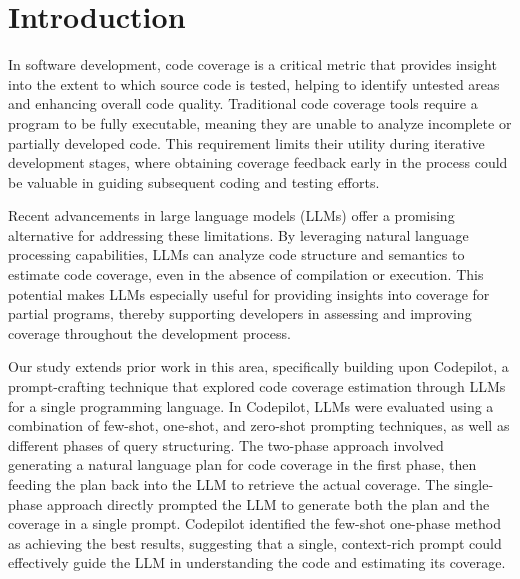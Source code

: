 \documentclass[sigconf]{acmart}
\begin{document}
\maketitle

\section{Introduction}
In software development, code coverage is a critical metric that provides insight into the extent to which source code is tested, helping to identify untested areas and enhancing overall code quality. Traditional code coverage tools require a program to be fully executable, meaning they are unable to analyze incomplete or partially developed code. This requirement limits their utility during iterative development stages, where obtaining coverage feedback early in the process could be valuable in guiding subsequent coding and testing efforts.

Recent advancements in large language models (LLMs) offer a promising alternative for addressing these limitations. By leveraging natural language processing capabilities, LLMs can analyze code structure and semantics to estimate code coverage, even in the absence of compilation or execution. This potential makes LLMs especially useful for providing insights into coverage for partial programs, thereby supporting developers in assessing and improving coverage throughout the development process.

Our study extends prior work in this area, specifically building upon Codepilot, a prompt-crafting technique that explored code coverage estimation through LLMs for a single programming language. In Codepilot, LLMs were evaluated using a combination of few-shot, one-shot, and zero-shot prompting techniques, as well as different phases of query structuring. The two-phase approach involved generating a natural language plan for code coverage in the first phase, then feeding the plan back into the LLM to retrieve the actual coverage. The single-phase approach directly prompted the LLM to generate both the plan and the coverage in a single prompt. Codepilot identified the few-shot one-phase method as achieving the best results, suggesting that a single, context-rich prompt could effectively guide the LLM in understanding the code and estimating its coverage.
\end{document}
